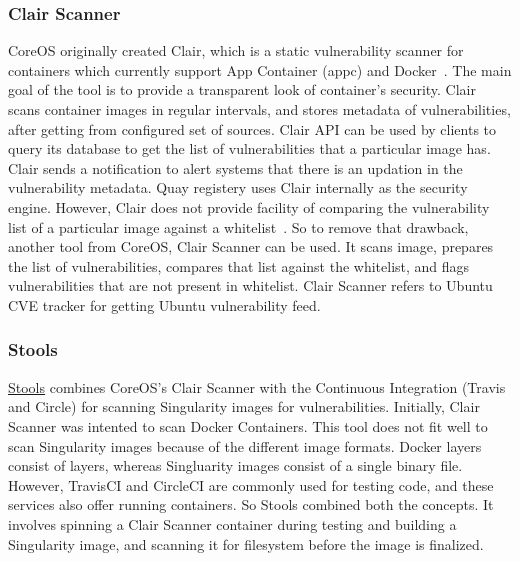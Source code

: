 \documentclass[a4paper,num-refs]{oup-contemporary}
\begin{document}
\subsubsection{Clair Scanner}

CoreOS originally created Clair, which is a static vulnerability scanner for containers which
currently support App Container (appc) and Docker~\cite{coreos_2019}. The main goal of the
tool is to provide a transparent look of container’s security. Clair scans container images in regular
intervals, and stores metadata of vulnerabilities, after getting from configured
set of sources. Clair API can be used by clients to query its database to get
the list of vulnerabilities that a particular image has. Clair sends a notification
to alert systems that there is an updation in the vulnerability metadata. Quay
registery uses Clair internally as the security engine. However, Clair does not 
provide facility of comparing
the vulnerability list of a particular image against a whitelist~\cite{arminc_2019}. So to remove
that drawback, another tool from CoreOS, Clair Scanner can be used. It scans image, prepares the list of
vulnerabilities, compares that list against the whitelist, and flags vulnerabilities
that are not present in whitelist.
Clair Scanner refers to Ubuntu CVE tracker for getting Ubuntu vulnerability feed.

\subsubsection{Stools}

\href{https://github.com/singularityhub/stools}{Stools} combines CoreOS's Clair Scanner with the Continuous Integration (Travis and
Circle) for scanning Singularity images for vulnerabilities.
Initially, Clair Scanner was intented to scan Docker Containers. This tool does not fit well
to scan Singularity images because of the different image formats. Docker layers
consist of layers, whereas Singluarity images consist of a single binary file.
However, TravisCI and CircleCI are commonly used for testing code, and these
services also offer running containers. So Stools combined both the concepts.
It involves spinning a Clair Scanner container during testing and building a
Singularity image, and scanning it for filesystem before the image is finalized.
\end{document}
